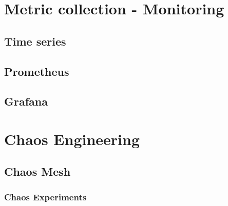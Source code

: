 \section{Metric collection - Monitoring}

\subsection{Time series}

\subsection{Prometheus}

\subsection{Grafana}


\section{Chaos Engineering}

\subsection{Chaos Mesh}

\subsubsection{Chaos Experiments}



